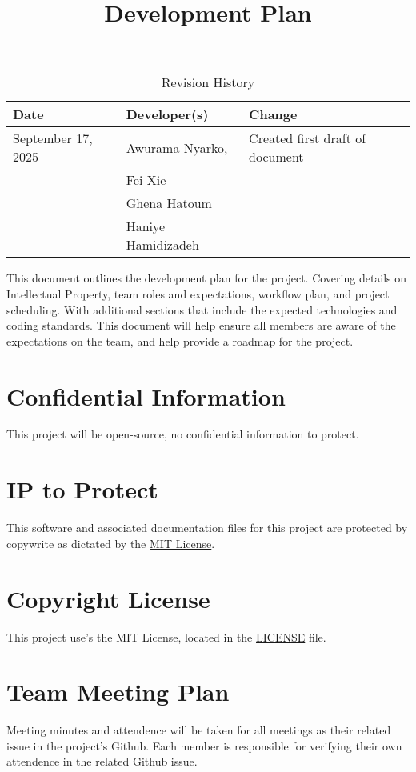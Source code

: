 \documentclass{article}
\title{Development Plan\\\progname}
\author{\authname}
\date{}
\begin{document}
\maketitle

\begin{table}[hp]
\caption{Revision History} \label{TblRevisionHistory}
\begin{tabularx}{\textwidth}{llX}
\toprule
\textbf{Date} & \textbf{Developer(s)} & \textbf{Change}\\
\midrule
September 17, 2025 & Awurama Nyarko, & Created first draft of document
 \\ & Fei Xie &
 \\ &Ghena Hatoum &
 \\ &Haniye Hamidizadeh &
 \\
\bottomrule
\end{tabularx}
\end{table}

\newpage{}
This document outlines the development plan for the project. Covering details on Intellectual Property, team roles and expectations, workflow plan, and project scheduling.
With additional sections that include the expected technologies and coding standards. This document will help ensure all members are aware of the expectations on the team, and help provide a roadmap for the project.

\section{Confidential Information}
This project will be open-source, no confidential information to protect.

\section{IP to Protect}
This software and associated documentation files for this project are protected by copywrite as dictated by the \href{https://github.com/thaafei/capstone-sfw2026/blob/main/LICENSE}{MIT License}.

\section{Copyright License}
This project use's the MIT License, located in the \href{https://github.com/thaafei/capstone-sfw2026/blob/main/LICENSE}{LICENSE} file.

\section{Team Meeting Plan}
Meeting minutes and attendence will be taken for all meetings as their related issue in the project's Github. Each member is responsible for verifying their own attendence in the related Github issue.
\end{document}
